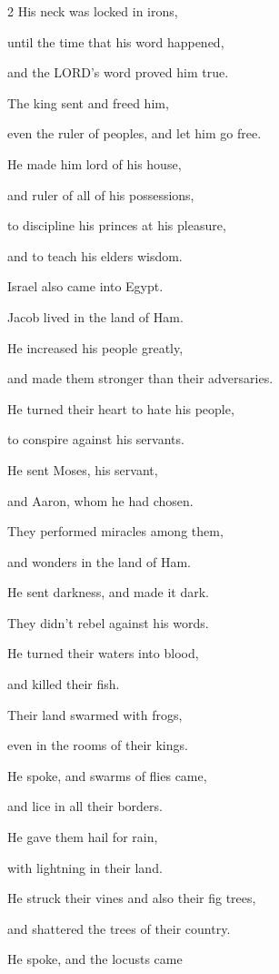 \begin{multicols}{2}
	His neck was locked in irons,
	
	
	\myverse{}until the time that his word happened,
	
	and the LORD’s word proved him true.
	
	
	\myverse{}The king sent and freed him,
	
	even the ruler of peoples, and let him go free.
	
	
	\myverse{}He made him lord of his house,
	
	and ruler of all of his possessions,
	
	
	\myverse{}to discipline his princes at his pleasure,
	
	and to teach his elders wisdom.
	
	
	\myverse{}Israel also came into Egypt.
	
	Jacob lived in the land of Ham.
	
	
	\myverse{}He increased his people greatly,
	
	and made them stronger than their adversaries.
	
	
	\myverse{}He turned their heart to hate his people,
	
	to conspire against his servants.
	
	
	\myverse{}He sent Moses, his servant,
	
	and Aaron, whom he had chosen.
	
	
	\myverse{}They performed miracles among them,
	
	and wonders in the land of Ham.
	
	
	\myverse{}He sent darkness, and made it dark.
	
	They didn’t rebel against his words.
	
	
	\myverse{}He turned their waters into blood,
	
	and killed their fish.
	
	
	\myverse{}Their land swarmed with frogs,
	
	even in the rooms of their kings.
	
	
	\myverse{}He spoke, and swarms of flies came,
	
	and lice in all their borders.
	
	
	\myverse{}He gave them hail for rain,
	
	with lightning in their land.
	
	
	\myverse{}He struck their vines and also their fig trees,
	
	and shattered the trees of their country.
	
	
	\myverse{}He spoke, and the locusts came
	

\end{multicols}
